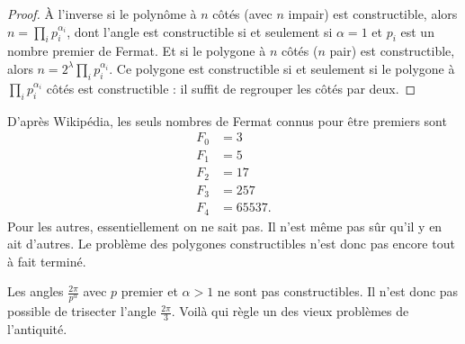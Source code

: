 \begin{proof}
	À l'inverse si le polynôme à \( n\) côtés (avec \( n\) impair) est constructible, alors \( n=\prod_ip_i^{\alpha_i}\), dont l'angle est constructible si et seulement si \( \alpha=1\) et \( p_i\) est un nombre premier de Fermat. Et si le polygone à \( n\) côtés (\( n\) pair) est constructible, alors \( n=2^{\lambda}\prod_ip_i^{\alpha_i}\). Ce polygone est constructible si et seulement si le polygone à \( \prod_ip_i^{\alpha_i}\) côtés est constructible : il suffit de regrouper les côtés par deux.
\end{proof}

\begin{remark}
	D'après Wikipédia\cite{PLQooFQtjyR}, les seuls nombres de Fermat connus pour être premiers sont
	\begin{subequations}
		\begin{align}
			F_0 & =3      \\
			F_1 & =5      \\
			F_2 & =17     \\
			F_3 & =257    \\
			F_4 & =65537.
		\end{align}
	\end{subequations}
	Pour les autres, essentiellement on ne sait pas. Il n'est même pas sûr qu'il y en ait d'autres. Le problème des polygones constructibles n'est donc pas encore tout à fait terminé.
\end{remark}

\begin{remark}
	Les angles \( \frac{ 2\pi }{ p^{\alpha} }\) avec \( p\) premier et \( \alpha>1\) ne sont pas constructibles. Il n'est donc pas possible de trisecter l'angle \( \frac{ 2\pi }{ 3 }\). Voilà qui règle un des vieux problèmes de l'antiquité.
\end{remark}
